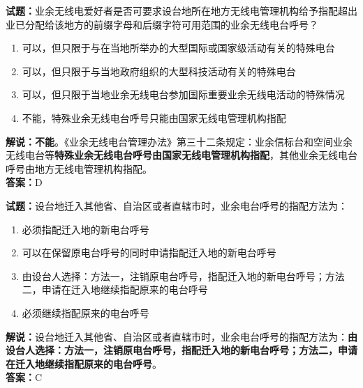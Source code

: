 \documentclass{ctexbook}
\begin{document}
\bigskip


\noindent\textbf{试题：}业余无线电爱好者是否可要求设台地所在地方无线电管理机构给予指配超出业已分配给该地方的前缀字母和后缀字符可用范围的业余无线电台呼号？
\begin{enumerate}[leftmargin=3em]
	\item 可以，但只限于与在当地所举办的大型国际或国家级活动有关的特殊电台
	\item 可以，但只限于与当地政府组织的大型科技活动有关的特殊电台
	\item 可以，但只限于当地业余无线电台参加国际重要业余无线电活动的特殊情况
	\item 不能，特殊业余无线电台呼号只能由国家无线电管理机构指配
\end{enumerate}
\textbf{解说：不能}。《业余无线电台管理办法》第三十二条规定：业余信标台和空间业余无线电台等\textbf{特殊业余无线电台呼号由国家无线电管理机构指配}，其他业余无线电台呼号由地方无线电管理机构指配。\\\noindent\textbf{答案：}D


\bigskip


\noindent\textbf{试题：}设台地迁入其他省、自治区或者直辖市时，业余电台呼号的指配方法为：
\begin{enumerate}[leftmargin=3em]
	\item 必须指配迁入地的新电台呼号
	\item 可以在保留原电台呼号的同时申请指配迁入地的新电台呼号
	\item 由设台人选择：方法一，注销原电台呼号，指配迁入地的新电台呼号；方法二，申请在迁入地继续指配原来的电台呼号
	\item 必须继续指配原来的电台呼号
\end{enumerate}
\noindent\textbf{解说：}设台地迁入其他省、自治区或者直辖市时，业余电台呼号的指配方法为：\textbf{由设台人选择：方法一，注销原电台呼号，指配迁入地的新电台呼号；方法二，申请在迁入地继续指配原来的电台呼号}。\\\noindent\textbf{答案：}C



\bigskip
\end{document}
